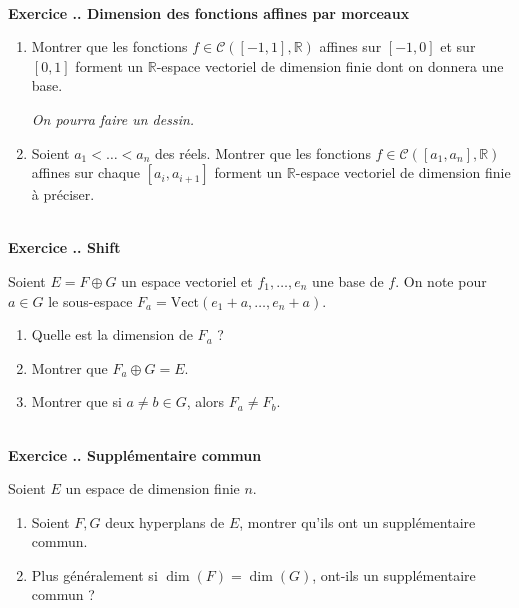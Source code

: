 \documentclass{article}
\newcommand{\mb}[1]{\mathbb{#1}}
\newcommand{\mc}[1]{\mathcal{#1}}
\newcounter{exo}
\newcommand{\exercice}[1][\null]{\textbf{\\ Exercice \thesection.\theexo. #1} \addtocounter{exo}{1}}
\begin{document}
\exercice[Dimension des fonctions affines par morceaux]

\begin{enumerate}

\item Montrer que les fonctions $f \in \mc{C}([-1,1], \mb{R})$ affines sur $[-1,0]$ et sur $[0,1]$ forment un $\mb{R}$-espace vectoriel de dimension finie dont on donnera une base.

\emph{On pourra faire un dessin.}

\item Soient $a_1 < \dots <a_n$ des réels. Montrer que les fonctions $f \in \mc{C}([a_1,a_n], \mb{R})$ affines sur chaque $[a_i, a_{i+1}]$ forment un $\mb{R}$-espace vectoriel de dimension finie à préciser.

\end{enumerate}


\exercice[Shift]

Soient $E = F \oplus G$ un espace vectoriel et $f_1, \dots, e_n$ une base de $f$. On note pour $a \in G$ le sous-espace $F_a = \text{Vect}(e_1 +a, \dots, e_n + a)$.

\begin{enumerate}

\item Quelle est la dimension de $F_a$ ?

\item Montrer que $F_a \oplus G = E$.

\item Montrer que si $a \neq b \in G$, alors $F_a \neq F_b$.

\end{enumerate}




\exercice[Supplémentaire commun]

Soient $E$ un espace de dimension finie $n$.

\begin{enumerate}

\item Soient $F,G$ deux hyperplans de $E$, montrer qu'ils ont un supplémentaire commun.

\item Plus généralement si $\dim(F) = \dim(G)$, ont-ils un supplémentaire commun ?

\end{enumerate}
\end{document}
